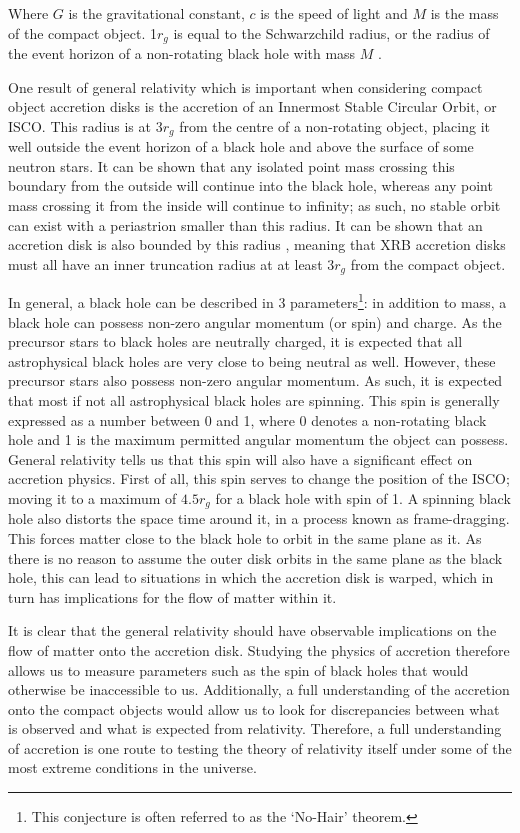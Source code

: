 Where $G$ is the gravitational constant, $c$ is the speed of light and $M$ is the mass of the compact object.  1$r_g$ is equal to the Schwarzchild radius, or the radius of the event horizon of a non-rotating black hole with mass $M$ \citep{Schwarzchild}.
\par One result of general relativity which is important when considering compact object accretion disks is the accretion of an Innermost Stable Circular Orbit, or ISCO.  This radius is at $3r_g$ from the centre of a non-rotating object, placing it well outside the event horizon of a black hole and above the surface of some neutron stars.  It can be shown that any isolated point mass crossing this boundary from the outside will continue into the black hole, whereas any point mass crossing it from the inside will continue to infinity; as such, no stable orbit can exist with a periastrion smaller than this radius. It can be shown that an accretion disk is also bounded by this radius \citep{Kozlowski_ISCO}, meaning that XRB accretion disks must all have an inner truncation radius at at least $3r_g$ from the compact object.
\par In general, a black hole can be described in 3 parameters\footnote{This conjecture is often referred to as the `No-Hair' theorem.}: in addition to mass, a black hole can possess non-zero angular momentum (or spin) and charge.  As the precursor stars to black holes are neutrally charged, it is expected that all astrophysical black holes are very close to being neutral as well.  However, these precursor stars also possess non-zero angular momentum.  As such, it is expected that most if not all astrophysical black holes are spinning.  This spin is generally expressed as a number between 0 and 1, where 0 denotes a non-rotating black hole and 1 is the maximum permitted angular momentum the object can possess.  General relativity tells us that this spin will also have a significant effect on accretion physics.  First of all, this spin serves to change the position of the ISCO; moving it to a maximum of $4.5r_g$ for a black hole with spin of 1.  A spinning black hole also distorts the space time around it, in a process known as frame-dragging.  This forces matter close to the black hole to orbit in the same plane as it.  As there is no reason to assume the outer disk orbits in the same plane as the black hole, this can lead to situations in which the accretion disk is warped, which in turn has implications for the flow of matter within it.
\par It is clear that the general relativity should have observable implications on the flow of matter onto the accretion disk.  Studying the physics of accretion therefore allows us to measure parameters such as the spin of black holes that would otherwise be inaccessible to us.  Additionally, a full understanding of the accretion onto the compact objects would allow us to look for discrepancies between what is observed and what is expected from relativity.  Therefore, a full understanding of accretion is one route to testing the theory of relativity itself under some of the most extreme conditions in the universe.